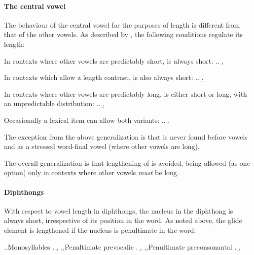 \paragraph{The central vowel}
\label{sec:central-vowel}

The behaviour of the central vowel \ipa{[ə]} for the purposes of length is different from that of the other vowels. As described by \citet[§2.3]{awbery86:_pembr_welsh}, the following conditions regulate its length:

\begin{itemize*}
\item In contexts where other vowels are predictably short, \ipa{[ə]} is always short:
\ex.\a.
\b.\par
\item In contexts which allow a length contrast, \ipa{[ə]} is also always short:
\ex.\a.
\b.\par
\item In contexts where other vowels are predictably long, \ipa{[ə]} is either short or long, with an unpredictable distribution:
\ex.\a.
\b.\par
Occasionally a lexical item can allow both variants:
\ex.\a.
\b.\par
\item The exception from the above generalization is that \ipa{[ə]} is never found before vowels and as a stressed word-final vowel (where other vowels are long).
\end{itemize*}

The overall generalization is that lengthening of \ipa{[ə]} is avoided, being allowed (as one option) only in contexts where other vowels \emph{must} be long.

\paragraph{Diphthongs}
\label{sec:diphthongs-3}

With respect to vowel length in diphthongs, the nucleus in the diphthong is always short, irrespective of its position in the word. As noted above, the glide element is lengthened if the nucleus is penultimate in the word:

\ex.\a.Monosyllables
\a.
\b.
\z.\b.Penultimate prevocalic
\a.
\b.
\z.\b.Penultimate preconsonantal
\a.
\b.


